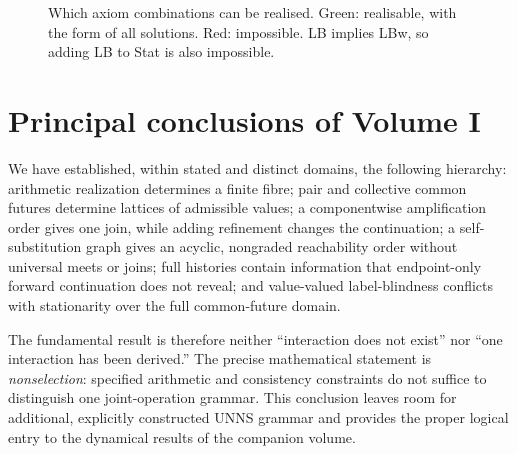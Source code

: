 \documentclass[11pt,oneside,openany]{book}
\theoremstyle{definition}
\theoremstyle{remark}
\begin{document}
\begin{figure}[t]
\centering
{}
\caption{Which axiom combinations can be realised. Green: realisable, with the form of all solutions. Red: impossible. LB implies LBw, so adding LB to Stat is also impossible.}\label{fig:axioms}
\end{figure}

\section{Principal conclusions of Volume I}
We have established, within stated and distinct domains, the following hierarchy: arithmetic realization determines a finite fibre; pair and collective common futures determine lattices of admissible values; a componentwise amplification order gives one join, while adding refinement changes the continuation; a self-substitution graph gives an acyclic, nongraded reachability order without universal meets or joins; full histories contain information that endpoint-only forward continuation does not reveal; and value-valued label-blindness conflicts with stationarity over the full common-future domain.

The fundamental result is therefore neither ``interaction does not exist'' nor ``one interaction has been derived.'' The precise mathematical statement is \emph{nonselection}: specified arithmetic and consistency constraints do not suffice to distinguish one joint-operation grammar. This conclusion leaves room for additional, explicitly constructed UNNS grammar and provides the proper logical entry to the dynamical results of the companion volume.
\end{document}
